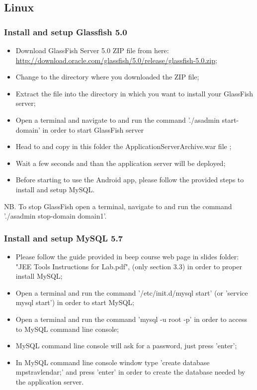 \subsection{Linux}
\label{subsect:Linux}

\subsubsection{Install and setup Glassfish 5.0}
\begin{itemize}
	\item Download GlassFish Server 5.0 ZIP file from here: \\ \href{http://download.oracle.com/glassfish/5.0/release/glassfish-5.0.zip}{\color{blue}http://download.oracle.com/glassfish/5.0/release/glassfish-5.0.zip};
	\item Change to the directory where you downloaded the ZIP file;
	\item Extract the file into the directory in which you want to install your GlassFish server;
	\item Open a terminal and navigate to  and run the command './asadmin start-domain' in order to start GlassFish server
	\item Head to  and copy in this folder the ApplicationServerArchive.war file ;
	\item Wait a few seconds and than the application server will be deployed;
	\item Before starting to use the Android app, please follow the provided steps to install and setup MySQL.
\end{itemize}
NB. To stop GlassFish open a terminal, navigate to  and run the command './asadmin stop-domain domain1'.

\subsubsection{Install and setup MySQL 5.7}
\begin{itemize}
	\item Please follow the guide provided in beep course web page in slides folder: "JEE Tools Instructions for Lab.pdf", (only section 3.3) in order to proper install MySQL;
	\item Open a terminal and run the command '/etc/init.d/mysql start' (or 'service mysql start') in order to start MySQL;
	\item Open a terminal and run the command 'mysql -u root -p' in order to access to MySQL command line console;
	\item MySQL command line console will ask for a password, just press 'enter';
	\item In MySQL command line console window type 'create database mps\textunderscore travlendar;' and press 'enter' in order to create the database needed by the application server.
\end{itemize}

